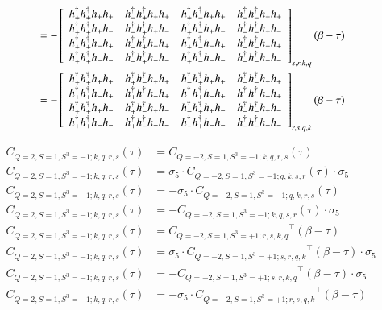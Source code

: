 \begin{equation}
\begin{aligned}
    &= - \left[ 
    {\begin{array}{cccc}
      \hdcor{+}{+}{+}{+} & \hdcor{+}{+}{+}{-} & \hdcor{+}{+}{-}{+} & \hdcor{+}{+}{-}{-} \\
      \hdcor{-}{+}{+}{+} & \hdcor{-}{+}{+}{-} & \hdcor{-}{+}{-}{+} & \hdcor{-}{+}{-}{-} \\
      \hdcor{+}{-}{+}{+} & \hdcor{+}{-}{+}{-} & \hdcor{+}{-}{-}{+} & \hdcor{+}{-}{-}{-} \\
      \hdcor{-}{-}{+}{+} & \hdcor{-}{-}{+}{-} & \hdcor{-}{-}{-}{+} & \hdcor{-}{-}{-}{-} \\
    \end{array} } \right]_{s,r,k,q} (\beta-\tau) \\
    &= - \left[ 
    {\begin{array}{cccc}
      \hdcor{+}{+}{+}{+} & \hdcor{+}{+}{-}{+} & \hdcor{+}{+}{+}{-} & \hdcor{+}{+}{-}{-} \\
      \hdcor{+}{-}{+}{+} & \hdcor{+}{-}{-}{+} & \hdcor{+}{-}{+}{-} & \hdcor{+}{-}{-}{-} \\
      \hdcor{-}{+}{+}{+} & \hdcor{-}{+}{-}{+} & \hdcor{-}{+}{+}{-} & \hdcor{-}{+}{-}{-} \\
      \hdcor{-}{-}{+}{+} & \hdcor{-}{-}{-}{+} & \hdcor{-}{-}{+}{-} & \hdcor{-}{-}{-}{-} \\
    \end{array} } \right]_{r,s,q,k} (\beta-\tau) \\
  \end{aligned}
\end{equation}

\begin{equation}
  \begin{aligned}
    C_{Q=2,S=1,S^3=-1;k,q,r,s} (\tau) &= {C_{Q=-2,S=1,S^3=-1;k,q,r,s}} (\tau) 
    \\
    C_{Q=2,S=1,S^3=-1;k,q,r,s} (\tau) &= \sigma_5\cdot {C_{Q=-2,S=1,S^3=-1;q,k,s,r}} (\tau)\cdot\sigma_5
    \\
    C_{Q=2,S=1,S^3=-1;k,q,r,s} (\tau) &= - \sigma_5\cdot {C_{Q=-2,S=1,S^3=-1;q,k,r,s}} (\tau)
    \\
    C_{Q=2,S=1,S^3=-1;k,q,r,s} (\tau) &= - {C_{Q=-2,S=1,S^3=-1;k,q,s,r}} (\tau)\cdot\sigma_5
    \\
    C_{Q=2,S=1,S^3=-1;k,q,r,s} (\tau) &= {C_{Q=-2,S=1,S^3=+1;r,s,k,q}}^\top (\beta-\tau) 
    \\
    C_{Q=2,S=1,S^3=-1;k,q,r,s} (\tau) &= \sigma_5\cdot {C_{Q=-2,S=1,S^3=+1;s,r,q,k}}^\top (\beta-\tau)\cdot\sigma_5
    \\
    C_{Q=2,S=1,S^3=-1;k,q,r,s} (\tau) &= - {C_{Q=-2,S=1,S^3=+1;s,r,k,q}}^\top (\beta-\tau)\cdot\sigma_5
    \\
    C_{Q=2,S=1,S^3=-1;k,q,r,s} (\tau) &= - \sigma_5\cdot {C_{Q=-2,S=1,S^3=+1;r,s,q,k}}^\top (\beta-\tau)
    \\
  \end{aligned}
\end{equation}

